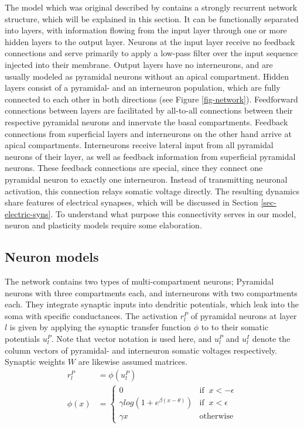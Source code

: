 The model which was original described by \cite{sacramento2018dendritic} contains a strongly recurrent network structure, which
will be explained in this section. It can be functionally separated into layers, with information flowing from the input
layer through one or more hidden layers to the output layer. Neurons at the input layer receive no feedback connections
and serve primarily to
apply a low-pass filter over the input sequence injected into their membrane.
Output layers have no interneurons, and are usually modeled as pyramidal neurons without an apical compartment.
Hidden layers consist of a pyramidal- and an
interneuron population, which are fully connected to each other in both directions (see Figure \ref{fig-network}).
Feedforward connections between layers are facilitated by all-to-all connections between their respective pyramidal neurons
and innervate the basal compartments. Feedback connections from superficial layers and interneurons on the other hand
arrive at apical compartments. Interneurons receive lateral input from all pyramidal neurons of their layer, as well as
feedback information from superficial pyramidal neurons. These feedback connections are special, since they connect one
pyramidal neuron to exactly one interneuron. Instead of transmitting neuronal activation, this connection relays somatic
voltage directly. The resulting dynamics share features of electrical synapses, which will be discussed in 
Section \ref{sec-electric-syns}. 
To understand what purpose this connectivity serves in our model,
neuron and plasticity models require some elaboration.


\subsection{Neuron models}\label{sec-neurons}



The network contains two types of multi-compartment neurons; Pyramidal neurons with three compartments each, and
interneurons with two compartments each. They integrate synaptic inputs into dendritic potentials,
which leak into the soma with specific conductances. The activation $r_l^P$ of pyramidal neurons at layer $l$ is given by applying
the synaptic transfer function $\phi$ to to their somatic potentials $u_l^P$. Note that vector notation is used here,
and $u_l^P$ and $u_l^I$ denote the column vectors of pyramidal- and interneuron somatic voltages respectively. Synaptic
weights $W$ are likewise assumed matrices.
\begin{align}
  r_l^P   & = \phi(u_l^P)                                                      \\
  \phi(x) & = \begin{cases}
                0                                 & \textrm{if } \ x < -\epsilon \\
                \gamma log(1+e^{\beta(x-\theta)}) & \textrm{if } \ x < \epsilon  \\
                \gamma x                          & \textrm{otherwise}
              \end{cases}
\end{align}

